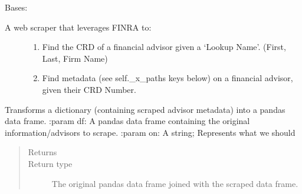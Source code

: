 \documentclass[letterpaper,10pt,english]{sphinxmanual}
\begin{document}
\begin{fulllineitems}
\label{\detokenize{index:ListManagement.search.finra.Finra}}
Bases: 
\begin{description}
\item[{A web scraper that leverages FINRA to:}] \leavevmode\begin{enumerate}
\def\theenumi{\arabic{enumi}}
\def\labelenumi{\theenumi )}
\makeatletter\def\p@enumii{\p@enumi \theenumi )}\makeatother
\item {} 
Find the CRD of a financial advisor given a ‘Lookup Name’. (First, Last, Firm Name)

\item {} 
Find metadata (see self.\_x\_paths keys below) on a financial advisor, given their CRD Number.

\end{enumerate}

\end{description}

\begin{fulllineitems}
\label{\detokenize{index:ListManagement.search.finra.Finra.return_scraped_data}}
Transforms a dictionary (containing scraped advisor metadata) into a pandas data frame.
:param df: A pandas data frame containing the original information/advisors to scrape.
:param on: A string; Represents what we should
\begin{quote}\begin{description}
\item[{Returns}] \leavevmode


\item[{Return type}] \leavevmode
The original pandas data frame joined with the scraped data frame.

\end{description}\end{quote}

\end{fulllineitems}



\end{fulllineitems}
\end{document}

